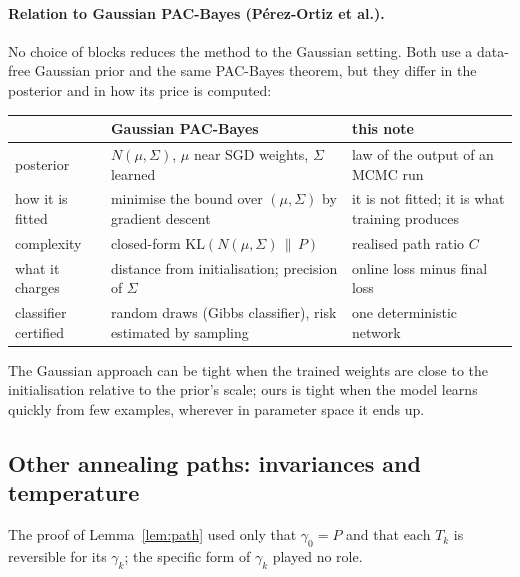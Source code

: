 \documentclass[11pt]{article}
\theoremstyle{definition}
\theoremstyle{remark}
\newcommand{\KL}{\mathrm{KL}}
\begin{document}
\paragraph{Relation to Gaussian PAC-Bayes (P\'erez-Ortiz et al.).} No choice of blocks reduces the method to the
Gaussian setting. Both use a data-free Gaussian prior and the same PAC-Bayes theorem, but they differ in the posterior and
in how its price is computed:
\begin{center}\small
\renewcommand{\arraystretch}{1.2}
\begin{tabular}{@{}p{3.0cm}p{6.0cm}p{5.6cm}@{}}
\toprule
 & Gaussian PAC-Bayes & this note\\
\midrule
posterior & $N(\mu,\Sigma)$, $\mu$ near SGD weights, $\Sigma$ learned & law of the output of an MCMC run\\
how it is fitted & minimise the bound over $(\mu,\Sigma)$ by gradient descent & it is not fitted; it is what training produces\\
complexity & closed-form $\KL(N(\mu,\Sigma)\,\|\,P)$ & realised path ratio $C$\\
what it charges & distance from initialisation; precision of $\Sigma$ & online loss minus final loss\\
classifier certified & random draws (Gibbs classifier), risk estimated by sampling & one deterministic network\\
\bottomrule
\end{tabular}
\end{center}
The Gaussian approach can be tight when the trained weights are close to the initialisation relative to the prior's
scale; ours is tight when the model learns quickly from few examples, wherever in parameter space it ends up.

\subsection{Other annealing paths: invariances and temperature}\label{sec:paths}
The proof of Lemma~\ref{lem:path} used only that $\gamma_0=P$ and that each $T_k$ is reversible for its $\gamma_k$; the
specific form of $\gamma_k$ played no role.
\end{document}
